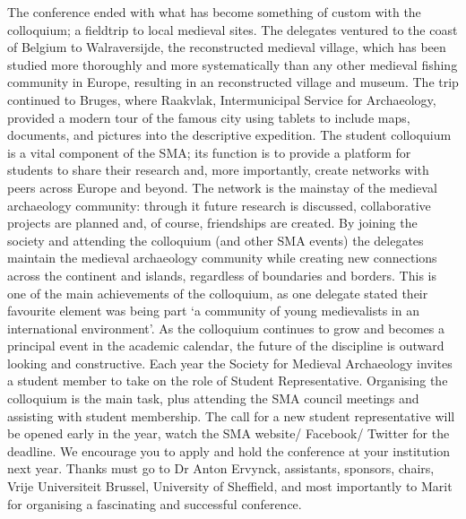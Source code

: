 \documentclass[%
	]{ijsra}
\begin{document}
The conference ended with what has become something of custom with the colloquium; a fieldtrip to local medieval sites. The delegates ventured to the coast of Belgium to Walraversijde, the reconstructed medieval village, which has been studied more thoroughly and more systematically than any other medieval fishing community in Europe, resulting in an reconstructed village and museum. The trip continued to Bruges, where Raakvlak, Intermunicipal Service for Archaeology, provided a modern tour of the famous city using tablets to include maps, documents, and pictures into the descriptive expedition. 
The student colloquium is a vital component of the SMA; its function is to provide a platform for students to share their research and, more importantly, create networks with peers across Europe and beyond. The network is the mainstay of the medieval archaeology community: through it future research is discussed, collaborative projects are planned and, of course, friendships are created. By joining the society and attending the colloquium (and other SMA events) the delegates maintain the medieval archaeology community while creating new connections across the continent and islands, regardless of boundaries and borders. This is one of the main achievements of the colloquium, as one delegate stated their favourite element was being part ‘a community of young medievalists in an international environment’. As the colloquium continues to grow and becomes a principal event in the academic calendar, the future of the discipline is outward looking and constructive.
Each year the Society for Medieval Archaeology invites a student member to take on the role of Student Representative. Organising the colloquium is the main task, plus attending the SMA council meetings and assisting with student membership. The call for a new student representative will be opened early in the year, watch the SMA website/ Facebook/ Twitter for the deadline. We encourage you to apply and hold the conference at your institution next year.
Thanks must go to Dr Anton Ervynck, assistants, sponsors, chairs, Vrije Universiteit Brussel, University of Sheffield, and most importantly to Marit for organising a fascinating and successful conference.


\iffalse
\IJSRAsection{small headline}

\IJSRAseparator
\fi

\IJSRAclosing%
\end{document}
